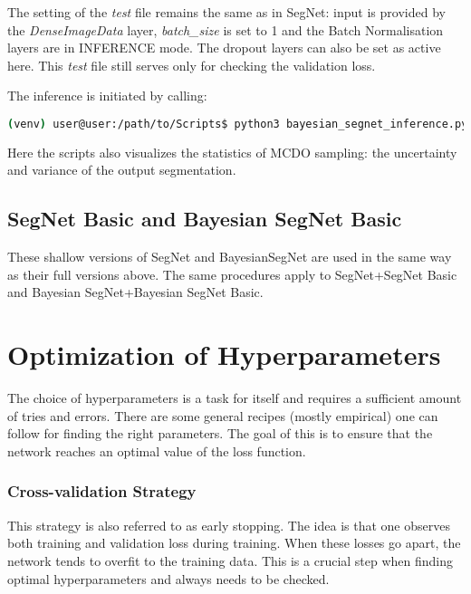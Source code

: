 \newpage
The setting of the \textit{test} file remains the same as in SegNet: input is provided by the \textit{DenseImageData} layer, \textit{batch\_size} is set to 1 and the Batch Normalisation layers are in INFERENCE mode. The dropout layers can also be set as active here. This \textit{test} file still serves only for checking the validation loss.

The inference is initiated by calling:

\begin{lstlisting}[language=bash]
(venv) user@user:/path/to/Scripts$ python3 bayesian_segnet_inference.py /path/to/inference.prototxt /path/to/final_weights.caffemodel /path/to/videofile.avi 
\end{lstlisting}

Here the scripts also visualizes the statistics of MCDO sampling: the uncertainty and variance of the output segmentation.

\subsection{SegNet Basic and Bayesian SegNet Basic}

These shallow versions of SegNet and BayesianSegNet are used in the same way as their full versions above. The same procedures apply to SegNet+SegNet Basic and Bayesian SegNet+Bayesian SegNet Basic.

\newpage
\section{Optimization of Hyperparameters}

The choice of hyperparameters is a task for itself and requires a sufficient amount of tries and errors. There are some general recipes (mostly empirical) one can follow for finding the right parameters. The goal of this is to ensure that the network reaches an optimal value of the loss function. \cite{stanford-github}

\subsubsection{Cross-validation Strategy}

This strategy is also referred to as early stopping. The idea is that one observes both training and validation loss during training. When these losses go apart, the network tends to overfit to the training data. This is a crucial step when finding optimal hyperparameters and always needs to be checked. \cite{stanford-github}

